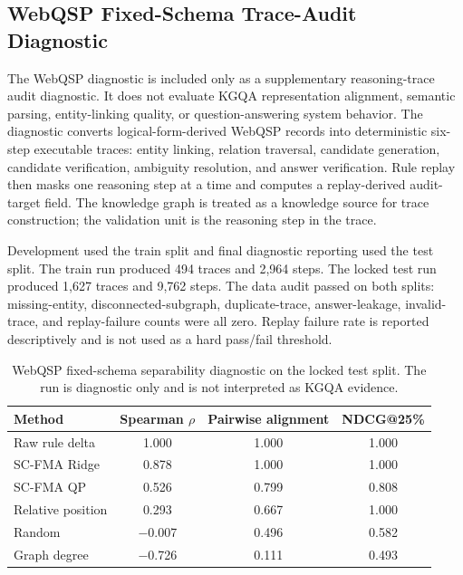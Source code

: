 \documentclass[a4paper,fleqn]{cas-sc}
\begin{document}
\subsection{WebQSP Fixed-Schema Trace-Audit Diagnostic}
\label{app:webqsp-trace-audit}

The WebQSP diagnostic is included only as a supplementary reasoning-trace audit diagnostic. It does not evaluate KGQA representation alignment, semantic parsing, entity-linking quality, or question-answering system behavior. The diagnostic converts logical-form-derived WebQSP records into deterministic six-step executable traces: entity linking, relation traversal, candidate generation, candidate verification, ambiguity resolution, and answer verification. Rule replay then masks one reasoning step at a time and computes a replay-derived audit-target field. The knowledge graph is treated as a knowledge source for trace construction; the validation unit is the reasoning step in the trace.

Development used the train split and final diagnostic reporting used the test split. The train run produced 494 traces and 2,964 steps. The locked test run produced 1,627 traces and 9,762 steps. The data audit passed on both splits: missing-entity, disconnected-subgraph, duplicate-trace, answer-leakage, invalid-trace, and replay-failure counts were all zero. Replay failure rate is reported descriptively and is not used as a hard pass/fail threshold.

\begin{table}[ht]
\caption{WebQSP fixed-schema separability diagnostic on the locked test split. The run is diagnostic only and is not interpreted as KGQA evidence.}
\label{tab:supp-webqsp-diagnostic}
\centering
\small
\begin{tabular}{lccc}
\toprule
\textbf{Method} & \textbf{Spearman $\rho$} & \textbf{Pairwise alignment} & \textbf{NDCG@25\%} \\
\midrule
Raw rule delta & 1.000 & 1.000 & 1.000 \\
SC-FMA Ridge & 0.878 & 1.000 & 1.000 \\
SC-FMA QP & 0.526 & 0.799 & 0.808 \\
Relative position & 0.293 & 0.667 & 1.000 \\
Random & $-$0.007 & 0.496 & 0.582 \\
Graph degree & $-$0.726 & 0.111 & 0.493 \\
\bottomrule
\end{tabular}
\end{table}
\end{document}
